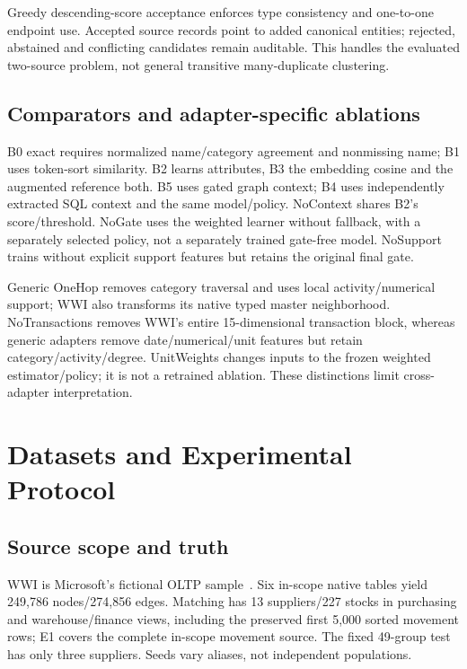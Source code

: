 \documentclass[conference,letterpaper]{IEEEtran}
\begin{document}
Greedy descending-score acceptance enforces type consistency and one-to-one endpoint use. Accepted source records point to added canonical entities; rejected, abstained and conflicting candidates remain auditable. This handles the evaluated two-source problem, not general transitive many-duplicate clustering.

\subsection{Comparators and adapter-specific ablations}
B0 exact requires normalized name/category agreement and nonmissing name; B1 uses token-sort similarity. B2 learns attributes, B3 the embedding cosine and the augmented reference both. B5 uses gated graph context; B4 uses independently extracted SQL context and the same model/policy. NoContext shares B2's score/threshold. NoGate uses the weighted learner without fallback, with a separately selected policy, not a separately trained gate-free model. NoSupport trains without explicit support features but retains the original final gate.

Generic OneHop removes category traversal and uses local activity/numerical support; WWI also transforms its native typed master neighborhood. NoTransactions removes WWI's entire 15-dimensional transaction block, whereas generic adapters remove date/numerical/unit features but retain category/activity/degree. UnitWeights changes inputs to the frozen weighted estimator/policy; it is not a retrained ablation. These distinctions limit cross-adapter interpretation.

\section{Datasets and Experimental Protocol}
\begin{table}[t]\centering\small
\caption{Full-source graphs versus matching groups and fixed splits. Each matching group supplies two source views; graph-node totals are not training-record totals.}\label{tab:profiles}\end{table}
\subsection{Source scope and truth}
WWI is Microsoft's fictional OLTP sample~\cite{wwi}. Six in-scope native tables yield 249,786 nodes/274,856 edges. Matching has 13 suppliers/227 stocks in purchasing and warehouse/finance views, including the preserved first 5,000 sorted movement rows; E1 covers the complete in-scope movement source. The fixed 49-group test has only three suppliers. Seeds vary aliases, not independent populations.
\end{document}

